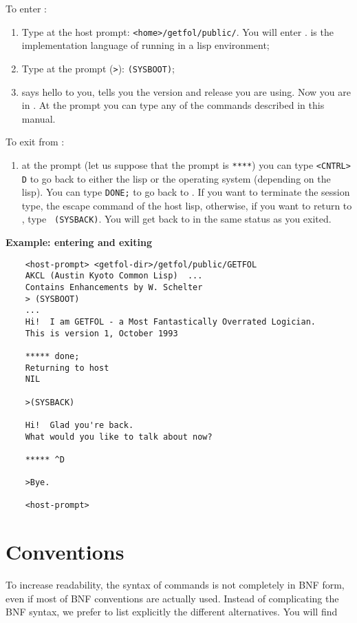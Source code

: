 To enter {\GF}:
%
\begin{enumerate}
	\item
		Type at the host prompt: {\tt <home>/getfol/public/{\GF}}.
		You will enter {\HG} \cite{giunchiglia35}.
		{\HG} is the implementation language of {\GF} running in a lisp
		environment;
	\item
		Type at the {\HG} prompt ({\tt >}): {\tt (SYSBOOT)};
	\item
		{\GF} says hello to you, tells you the version and release you are
		using. 
		Now you are in {\GF}.
		At the prompt you can type any of the commands described in this manual.
\end{enumerate}

To exit from {\GF}:
%
\begin{enumerate}
	\item
		at the prompt (let us suppose that the prompt is {\tt *****}) you can
		type {\tt <CNTRL> D} to go back to either the lisp or the operating
		system (depending on the lisp).
		You can type {\tt DONE;} to go back to {\HG}.
		If you want to terminate the session type, the escape command of the
		host lisp, otherwise, if you want to return to {\GF}, type {\tt
		(SYSBACK)}.
		You will get back to {\GF} in the same status as you exited.
\end{enumerate}

\vspace*{0.2cm}
{\bf Example: entering and exiting {\GF}}

\begin{verbatim}
	<host-prompt> <getfol-dir>/getfol/public/GETFOL
	AKCL (Austin Kyoto Common Lisp)  ...
	Contains Enhancements by W. Schelter
	> (SYSBOOT)
	...
	Hi!  I am GETFOL - a Most Fantastically Overrated Logician.
	This is version 1, October 1993

	***** done;
	Returning to host
	NIL

	>(SYSBACK)

	Hi!  Glad you're back.
	What would you like to talk about now?

	***** ^D

	>Bye.

	<host-prompt>
\end{verbatim}


\section{Conventions}
\label{sec-conv}

To increase readability, the syntax of commands is not completely in BNF
form, even if most of BNF conventions are actually used.
Instead of complicating the BNF syntax, we prefer to list explicitly the
different alternatives.
You will find

